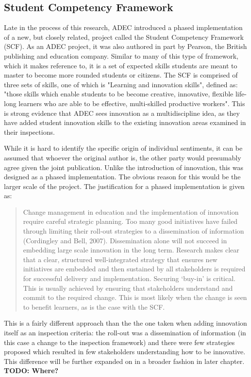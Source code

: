 \subsection{Student Competency Framework}

Late in the process of this research, ADEC introduced a phased implementation of a new, but closely related, project called the Student Competency Framework (SCF). As an ADEC project, it was also authored in part by Pearson, the British publishing and education company. Similar to many of this type of framework, which it makes reference to, it is a set of expected skills students are meant to master to become more rounded students or citizens. The SCF is comprised of three sets of skills, one of which is "Learning and innovation skills", defined as: "those skills which enable students to be become creative, innovative, flexible life-long learners who are able to be effective, multi-skilled productive workers". This is strong evidence that ADEC sees innovation as a multidiscipline idea, as they have added student innovation skills to the existing innovation areas examined in their inspections.

While it is hard to identify the specific origin of individual sentiments, it can be assumed that whoever the original author is, the other party would presumably agree given the joint publication. Unlike the introduction of innovation, this was designed as a phased implementation. The obvious reason for this would be the larger scale of the project. The justification for a phased implementation is given as:

\begin{quote}
Change management in education and the implementation of innovation require careful strategic planning. Too many good initiatives have failed through limiting their roll-out strategies to a dissemination of information (Cordingley and Bell, 2007). Dissemination alone will not succeed in embedding large scale innovation in the long term. Research makes clear that a clear, structured well-integrated strategy that ensures new initiatives are embedded and then sustained by all stakeholders is required for successful delivery and implementation. Securing ‘buy-in’ is critical. This is usually achieved by ensuring that stakeholders understand and commit to the required change. This is most likely when the change is seen to benefit learners, as is the case with the SCF.
\end{quote}

This is a fairly different approach than the the one taken when adding innovation itself as an inspection criteria: the roll-out was a dissemination of information (in this case a change to the inspection framework) and there were few strategies proposed which resulted in few stakeholders understanding how to be innovative. This difference will be further expanded on in a broader fashion in later chapter. \textbf{TODO: Where?}

